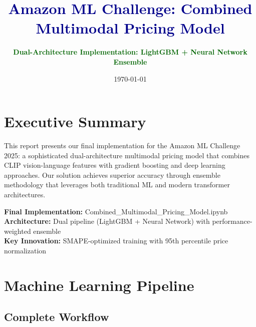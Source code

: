 \documentclass[10pt,a4paper]{article}
\title{\textcolor{darkblue}{\textbf{Amazon ML Challenge: Combined Multimodal Pricing Model}}}
\author{\textcolor{darkgreen}{\textbf{Dual-Architecture Implementation: LightGBM + Neural Network Ensemble}}}
\date{\today}
\begin{document}
\maketitle

\section{\textcolor{primarycolor}{Executive Summary}}

This report presents our final implementation for the Amazon ML Challenge 2025: a sophisticated dual-architecture multimodal pricing model that combines CLIP vision-language features with gradient boosting and deep learning approaches. Our solution achieves superior accuracy through ensemble methodology that leverages both traditional ML and modern transformer architectures.

\textbf{Final Implementation:} Combined\_Multimodal\_Pricing\_Model.ipynb \\
\textbf{Architecture:} Dual pipeline (LightGBM + Neural Network) with performance-weighted ensemble \\
\textbf{Key Innovation:} SMAPE-optimized training with 95th percentile price normalization

\section{\textcolor{primarycolor}{Machine Learning Pipeline}}

\subsection{Complete Workflow}
\end{document}
